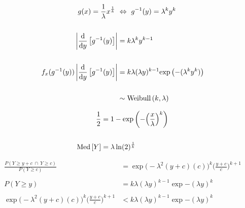 \documentclass[12pt]{article}
\begin{document}
\begin{enumerate}


\begin{align*}
    g(x) = \frac{1}{\lambda} x^{\frac{1}{k}} ~&\Leftrightarrow~ g^{-1}(y) = \lambda^ky^k \\ \\ 
    \left|\dfrac{\text{d}}{\text{d} y}\left[g^{-1}(y)\right]\right| &= k\lambda^ky^{k-1} \\ \\ 
    f_x(g^{-1}(y)) \left|\dfrac{\text{d}}{\text{d} y}\left[g^{-1}(y)\right]\right| &= k\lambda (\lambda y)^{k-1}\mathrm{exp}\left(-(\lambda^ky^k)\right) \\ \\ 
    &\sim  \text{Weibull}\left(k,\lambda\right)
\end{align*}


\begin{align*}
    \frac{1}{2} &= 1 - \mathrm{exp}\left(-\Big(\frac{x}{\lambda}\Big)^k\right) \\ \\ 
    \text{Med}\left[Y\right] &= \lambda\ln(2)^{\frac{1}{k}} 
\end{align*}



\begin{align*}
    \frac{P(Y \geq y + c ~\cap~ Y \geq c )}{P(Y \geq c)} &= \exp{\Big(-\lambda^2(y+c)(c)\Big)^k} \Big(\frac{y+c}{c}\Big)^{k+1} \\ \\ 
    P(Y \geq y) &= k\lambda (\lambda y)^{k-1}\exp{-(\lambda y)^k} \\ \\ 
    \exp{\Big(-\lambda^2(y+c)(c)\Big)^k} \Big(\frac{y+c}{c}\Big)^{k+1} &< k\lambda (\lambda y)^{k-1}\exp{-(\lambda y)^k}
\end{align*}


\end{enumerate}
\end{document}
